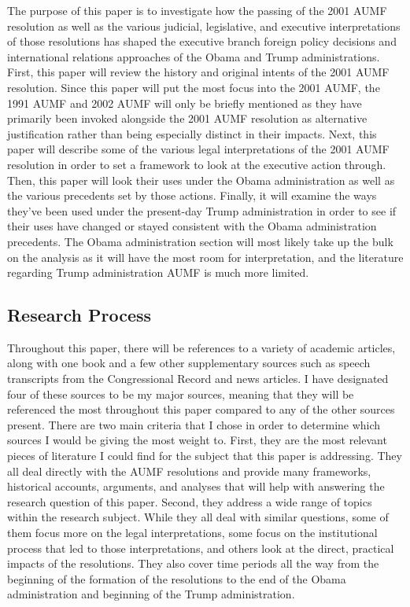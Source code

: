 \documentclass[12pt]{article}
\begin{document}
The purpose of this paper is to investigate how the passing of the 2001 AUMF resolution as well as the various judicial, legislative, and executive interpretations of those resolutions has shaped the executive branch foreign policy decisions and international relations approaches of the Obama and Trump administrations.
First, this paper will review the history and original intents of the 2001 AUMF resolution. 
Since this paper will put the most focus into the 2001 AUMF, the 1991 AUMF and 2002 AUMF will only be briefly mentioned as they have primarily been invoked alongside the 2001 AUMF resolution as alternative justification rather than being especially distinct in their impacts.
Next, this paper will describe some of the various legal interpretations of the 2001 AUMF resolution in order to set a framework to look at the executive action through.
Then, this paper will look their uses under the Obama administration as well as the various precedents set by those actions.
Finally, it will examine the ways they've been used under the present-day Trump administration in order to see if their uses have changed or stayed consistent with the Obama administration precedents.
The Obama administration section will most likely take up the bulk on the analysis as it will have the most room for interpretation, and the literature regarding Trump administration AUMF is much more limited.

\subsection*{Research Process}
Throughout this paper, there will be references to a variety of academic articles,  along with one book and a few other supplementary sources such as speech transcripts from the Congressional Record and news articles.
I have designated four of these sources to be my major sources, meaning that they will be referenced the most throughout this paper compared to any of the other sources present.
There are two main criteria that I chose in order to determine which sources I would be giving the most weight to.
First, they are the most relevant pieces of literature I could find for the subject that this paper is addressing.
They all deal directly with the AUMF resolutions and provide many frameworks, historical accounts, arguments, and analyses that will help with answering the research question of this paper.
Second, they address a wide range of topics within the research subject.
While they all deal with similar questions, some of them focus more on the legal interpretations, some focus on the institutional process that led to those interpretations, and others look at the direct, practical impacts of the resolutions.
They also cover time periods all the way from the beginning of the formation of the resolutions to the end of the Obama administration and beginning of the Trump administration.
\end{document}
